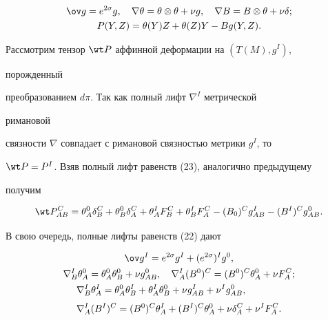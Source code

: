 \begin{gather}


\ov g=e^{2\sigma}g,\quad \nabla\theta=\theta\otimes\theta+\nu g,


\quad \nabla B=B\otimes\theta+\nu\delta; \\


P(Y,Z)=\theta(Y)Z+\theta(Z)Y-B g(Y,Z).


\end{gather}





Рассмотрим тензор $\wt P$ аффинной деформации на $(T(M),g^I)$,


порожденный


преобразованием $d\pi$. Так как полный лифт $\nabla^I$ метрической


римановой


связности $\nabla$ совпадает с римановой связностью метрики $g^I$, то


$\wt P=P^I$. Взяв полный лифт равенств (23), аналогично предыдущему


получим


\begin{equation}


\wt P^C_{AB}=\theta^0_A\delta^C_B+\theta^0_B\delta^C_A


+\theta^I_A F^C_B+\theta^I_B F^C_A-(B_0)^C


g^I_{AB}-(B^I)^C g^0_{AB}.


\end{equation}


В свою очередь, полные лифты равенств (22) дают


\begin{gather}


\ov g^I=e^{2\sigma}g^I+(e^{2\sigma})^I g^0,\\


\nabla^I_B\theta^0_A=\theta^0_A\theta^0_B+\nu g^0_{AB},\quad


\nabla^I_A(B^0)^C=(B^0)^C\theta^0_A+\nu F^C_A; \\


\begin{split}


&\nabla^I_B\theta^I_A=\theta^0_A\theta^I_B+\theta^I_A


\theta^0_B+\nu g^I_{AB}+\nu^I g^0_{AB}, \\[1mm]


&\nabla^I_A(B^I)^C=(B^0)^C\theta^I_A+


(B^I)^C\theta^0_A+\nu\delta^C_A+\nu^I F^C_A.


\end{split}


\end{gather}


